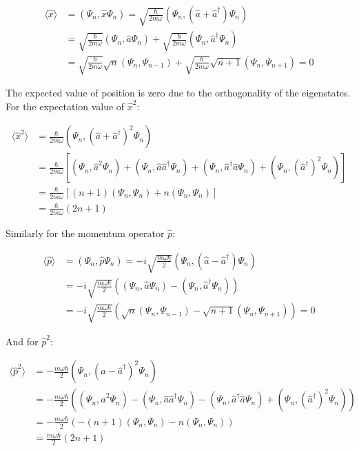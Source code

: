 \documentclass[10pt]{article}
\begin{document}
\begin{align*}
\langle\hat{x}\rangle &= (\Psi_n, \hat{x}\Psi_n) = \sqrt{\frac{\hbar}{2m\omega}}(\Psi_n, (\hat{a}+\hat{a}^\dagger)\Psi_n) \\
&= \sqrt{\frac{\hbar}{2m\omega}}(\Psi_n, \hat{a}\Psi_n) + \sqrt{\frac{\hbar}{2m\omega}}(\Psi_n, \hat{a}^\dagger\Psi_n) \\
&= \sqrt{\frac{\hbar}{2m\omega}}\sqrt{n}(\Psi_n, \Psi_{n-1}) + \sqrt{\frac{\hbar}{2m\omega}}\sqrt{n+1}(\Psi_n, \Psi_{n+1}) = 0
\end{align*}

The expected value of position is zero due to the orthogonality of the eigenstates. For the expectation value of $\hat{x}^2$:

\begin{align*}
\langle\hat{x}^2\rangle &= \frac{\hbar}{2m\omega}(\Psi_n, (\hat{a}+\hat{a}^\dagger)^2\Psi_n) \\
&= \frac{\hbar}{2m\omega}[(\Psi_n, \hat{a}^2\Psi_n) + (\Psi_n, \hat{a}\hat{a}^\dagger\Psi_n) + (\Psi_n, \hat{a}^\dagger\hat{a}\Psi_n) + (\Psi_n, (\hat{a}^\dagger)^2\Psi_n)] \\
&= \frac{\hbar}{2m\omega}[(n+1)(\Psi_n, \Psi_n) + n(\Psi_n, \Psi_n)] \\
&= \frac{\hbar}{2m\omega}(2n+1) \tag{5.61}
\end{align*}

Similarly for the momentum operator $\hat{p}$:

\begin{align*}
\langle\hat{p}\rangle &= (\Psi_n, \hat{p}\Psi_n) = -i\sqrt{\frac{m\omega\hbar}{2}}(\Psi_n, (\hat{a}-\hat{a}^\dagger)\Psi_n) \\
&= -i\sqrt{\frac{m\omega\hbar}{2}}((\Psi_n, \hat{a}\Psi_n) - (\Psi_n, \hat{a}^\dagger\Psi_n)) \\
&= -i\sqrt{\frac{m\omega\hbar}{2}}(\sqrt{n}(\Psi_n, \Psi_{n-1}) - \sqrt{n+1}(\Psi_n, \Psi_{n+1})) = 0
\end{align*}

And for $\hat{p}^2$:

\begin{align*}
\langle\hat{p}^2\rangle &= -\frac{m\omega\hbar}{2}(\Psi_n, (\hat{a}-\hat{a}^\dagger)^2\Psi_n) \\
&= -\frac{m\omega\hbar}{2}((\Psi_n, \hat{a}^2\Psi_n) - (\Psi_n, \hat{a}\hat{a}^\dagger\Psi_n) - (\Psi_n, \hat{a}^\dagger\hat{a}\Psi_n) + (\Psi_n, (\hat{a}^\dagger)^2\Psi_n)) \\
&= -\frac{m\omega\hbar}{2}(-(n+1)(\Psi_n, \Psi_n) - n(\Psi_n, \Psi_n)) \\
&= \frac{m\omega\hbar}{2}(2n+1) \tag{5.62}
\end{align*}
\end{document}
